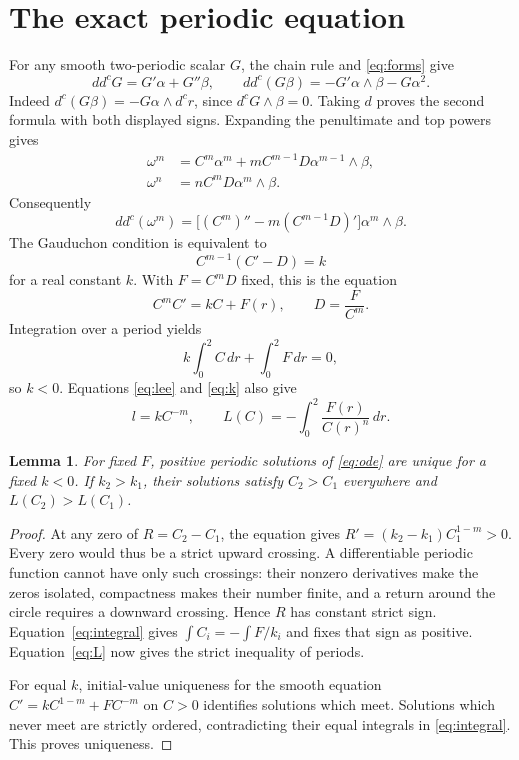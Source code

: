 \documentclass[11pt]{article}
\newcommand{\ddc}{dd^c}
\newtheorem{lemma}[theorem]{Lemma}
\theoremstyle{remark}\newtheorem{remark}[theorem]{Remark}
\begin{document}
\section{The exact periodic equation}
For any smooth two-periodic scalar $G$, the chain rule and
\eqref{eq:forms} give
\begin{equation}\label{eq:scalar}
 \ddc G=G'\alpha+G''\beta,
 \qquad
 \ddc(G\beta)=-G'\alpha\wedge\beta-G\alpha^2.
\end{equation}
Indeed $d^c(G\beta)=-G\alpha\wedge d^cr$, since
$d^cG\wedge\beta=0$. Taking $d$ proves the second formula with
both displayed signs. Expanding the penultimate and top powers gives
\begin{align*}
 \omega^m&=C^m\alpha^m+mC^{m-1}D\alpha^{m-1}\wedge\beta,\\
 \omega^n&=nC^mD\alpha^m\wedge\beta.
\end{align*}
Consequently
\[
 \ddc(\omega^m)=
 \bigl[(C^m)''-m(C^{m-1}D)'\bigr]\alpha^m\wedge\beta.
\]
The Gauduchon condition is equivalent to
\begin{equation}\label{eq:k}
 C^{m-1}(C'-D)=k
\end{equation}
for a real constant $k$. With $F=C^mD$ fixed, this is the equation
\begin{equation}\label{eq:ode}
 C^mC'=kC+F(r),\qquad D=\frac{F}{C^m}.
\end{equation}
Integration over a period yields
\begin{equation}\label{eq:integral}
 k\int_0^2C\,dr+\int_0^2F\,dr=0,
\end{equation}
so $k<0$. Equations \eqref{eq:lee} and \eqref{eq:k} also give
\begin{equation}\label{eq:L}
 l=kC^{-m},\qquad
 L(C)=-\int_0^2\frac{F(r)}{C(r)^n}\,dr.
\end{equation}

\begin{lemma}\label{lem:order}
For fixed $F$, positive periodic solutions of \eqref{eq:ode}
are unique for a fixed $k<0$. If $k_2>k_1$, their solutions satisfy
$C_2>C_1$ everywhere and $L(C_2)>L(C_1)$.
\end{lemma}
\begin{proof}
At any zero of $R=C_2-C_1$, the equation gives
$R'=(k_2-k_1)C_1^{1-m}>0$. Every zero would thus be a strict
upward crossing. A differentiable periodic function cannot have
only such crossings: their nonzero derivatives make the zeros
isolated, compactness makes their number finite, and a return around
the circle requires a downward crossing. Hence $R$ has constant
strict sign. Equation~\eqref{eq:integral} gives
$\int C_i=-\int F/k_i$ and fixes that sign as positive.
Equation~\eqref{eq:L} now gives the strict inequality of periods.

For equal $k$, initial-value uniqueness for the smooth equation
$C'=kC^{1-m}+FC^{-m}$ on $C>0$ identifies solutions which meet.
Solutions which never meet are strictly ordered, contradicting their
equal integrals in \eqref{eq:integral}. This proves uniqueness.
\end{proof}
\end{document}

